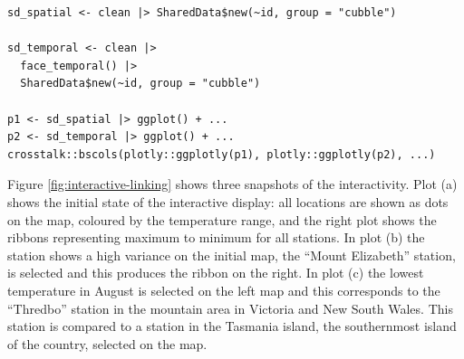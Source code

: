 \documentclass[
  shortnames]{jss}
\begin{document}
\begin{verbatim}
sd_spatial <- clean |> SharedData$new(~id, group = "cubble")

sd_temporal <- clean |> 
  face_temporal() |> 
  SharedData$new(~id, group = "cubble")
  
p1 <- sd_spatial |> ggplot() + ...
p2 <- sd_temporal |> ggplot() + ...
crosstalk::bscols(plotly::ggplotly(p1), plotly::ggplotly(p2), ...)
\end{verbatim}

Figure \ref{fig:interactive-linking} shows three snapshots of the interactivity. Plot (a) shows the initial state of the interactive display: all locations are shown as dots on the map, coloured by the temperature range, and the right plot shows the ribbons representing maximum to minimum for all stations. In plot (b) the station shows a high variance on the initial map, the ``Mount Elizabeth'' station, is selected and this produces the ribbon on the right. In plot (c) the lowest temperature in August is selected on the left map and this corresponds to the ``Thredbo'' station in the mountain area in Victoria and New South Wales. This station is compared to a station in the Tasmania island, the southernmost island of the country, selected on the map.
\end{document}

